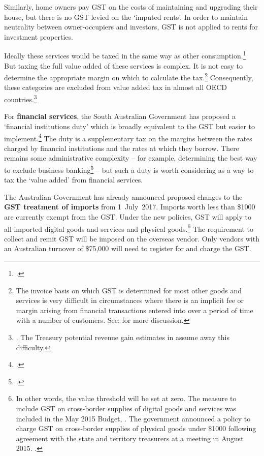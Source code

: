 Similarly, home owners pay GST on the costs of maintaining and upgrading their house, but there is no GST levied on the ‘imputed rents’. In order to maintain neutrality between owner-occupiers and investors, GST is not applied to rents for investment properties.

Ideally these services would be taxed in the same way as other consumption.\footcites{Freebairn2013}[][52]{HenryTaxReview2010}  But taxing the full value added of these services is complex. It is not easy to determine the appropriate margin on which to calculate the tax.\footnote{The invoice basis on which GST is determined for most other goods and services is very difficult in circumstances where there is an implicit fee or margin arising from financial transactions entered into over a period of time with a number of customers. See: \textcites{Evans2015}{Davis2015} for more discussion.}  
Consequently, these categories are excluded from value added tax in almost all OECD countries.\footnote{\textcite[][21]{OECD2014}. The Treasury potential revenue gain estimates in  assume away this difficulty.}  

For \textbf{financial services}, the South Australian Government has proposed a ‘financial institutions duty’ which is broadly equivalent to the GST but easier to implement.\footcites{Evans2015}{Weatherill2015}  The duty is a supplementary tax on the margins between the rates charged by financial institutions and the rates at which they borrow. There remains some administrative complexity – for example, determining the best way to exclude business banking\footcite{Davis2015}  – but such a duty is worth considering as a way to tax the ‘value added’ from financial services. 

The Australian Government has already announced proposed changes to the \textbf{GST treatment of imports} from 1~July~2017. Imports worth less than \$1000 are currently exempt from the GST. Under the new policies, GST will apply to all imported digital goods and services and physical goods.\footnote{In other words, the value threshold will be set at zero. The measure to include GST on cross-border supplies of digital goods and services was included in the May 2015 Budget,
\textcite[][20]{Treasury2015BudgetPapers201516}. The government announced a policy to charge GST on cross-border supplies of physical goods under \$1000 following agreement with the state and territory treasurers at a meeting in August 2015. \textcite{Hockey2015--GST-import-threshold}.}  The requirement to collect and remit GST will be imposed on the overseas vendor. Only vendors with an Australian turnover of \$75,000 will need to register for and charge the GST.

